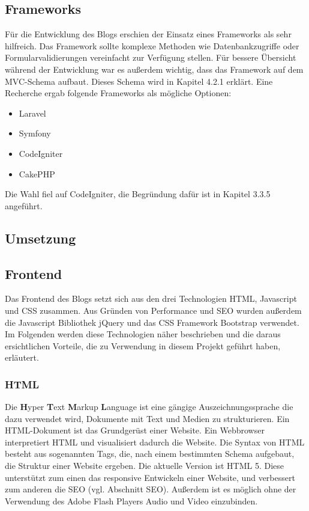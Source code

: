     \subsection*{Frameworks}
    Für die Entwicklung des Blogs erschien der Einsatz eines Frameworks als sehr hilfreich. Das Framework sollte komplexe Methoden wie
    Datenbankzugriffe oder Formularvalidierungen vereinfacht zur Verfügung stellen. Für bessere Übersicht während der Entwicklung war es außerdem
    wichtig, dass das Framework auf dem MVC-Schema aufbaut. Dieses Schema wird in Kapitel 4.2.1 erklärt. Eine Recherche ergab folgende Frameworks als mögliche
    Optionen:

    \begin{itemize}
      \item Laravel
      \item Symfony
      \item CodeIgniter
      \item CakePHP
    \end{itemize}

    Die Wahl fiel auf CodeIgniter, die Begründung dafür ist in Kapitel 3.3.5 angeführt.

  \subsection{Umsetzung}

    \subsection*{Frontend}
    Das Frontend des Blogs setzt sich aus den drei Technologien HTML, Javascript und CSS zusammen. Aus Gründen von Performance und SEO wurden außerdem
    die Javascript Bibliothek jQuery und das CSS Framework Bootstrap verwendet. Im Folgenden werden diese Technologien näher beschrieben und die daraus
    ersichtlichen Vorteile, die zu Verwendung in diesem Projekt geführt haben, erläutert.

      \subsubsection*{HTML}
      Die {\textbf{H}yper \textbf{T}ext \textbf{M}arkup \textbf{L}anguage\cite{html}} ist eine gängige Auszeichnungssprache die dazu verwendet wird, Dokumente mit Text und Medien zu strukturieren.
      Ein HTML-Dokument ist das Grundgerüst einer Website. Ein Webbrowser interpretiert
      HTML und visualisiert dadurch die Website. Die Syntax von HTML besteht aus sogenannten Tags, die, nach einem
      bestimmten Schema aufgebaut, die Struktur einer Website ergeben. Die aktuelle Version ist HTML 5. Diese unterstützt zum einen das responsive
      Entwickeln einer Website, und verbessert zum anderen die SEO (vgl. Abschnitt SEO). Außerdem ist es möglich ohne der Verwendung des Adobe Flash Players Audio und Video einzubinden.

